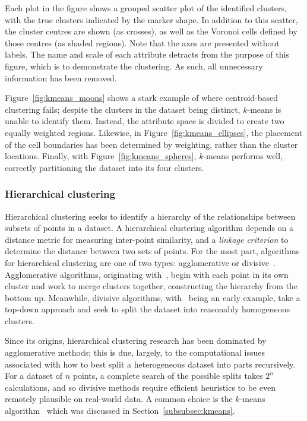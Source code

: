 Each plot in the figure shows a grouped scatter plot of the identified clusters,
with the true clusters indicated by the marker shape. In addition to this
scatter, the cluster centres are shown (as crosses), as well as the Voronoi
cells defined by those centres (as shaded regions). Note that the axes are
presented without labels. The name and scale of each attribute detracts from the
purpose of this figure, which is to demonstrate the clustering. As such, all
unnecessary information has been removed.

Figure~\ref{fig:kmeans_moons} shows a stark example of where centroid-based
clustering fails; despite the clusters in the dataset being distinct,
\(k\)-means is unable to identify them. Instead, the attribute space is divided
to create two equally weighted regions. Likewise, in
Figure~\ref{fig:kmeans_ellipses}, the placement of the cell boundaries has been
determined by weighting, rather than the cluster locations. Finally, with
Figure~\ref{fig:kmeans_spheres}, \(k\)-means performs well, correctly
partitioning the dataset into its four clusters.

\subsubsection{Hierarchical clustering}

Hierarchical clustering seeks to identify a hierarchy of the relationships
between subsets of points in a dataset. A hierarchical clustering algorithm
depends on a distance metric for measuring inter-point similarity, and a
\emph{linkage criterion} to determine the distance between two sets of points.
For the most part, algorithms for hierarchical clustering are one of two types:
agglomerative or divisive~\cite{Kaufman1990}. Agglomerative algorithms,
originating with~\cite{Johnson1967,Ward1963}, begin with each point in its own
cluster and work to merge clusters together, constructing the hierarchy from the
bottom up. Meanwhile, divisive algorithms, with~\cite{Edwards1965} being an
early example, take a top-down approach and seek to split the dataset into
reasonably homogeneous clusters.

Since its origins, hierarchical clustering research has been dominated by
agglomerative methods; this is due, largely, to the computational issues
associated with how to best split a heterogeneous dataset into parts
recursively. For a dataset of \(n\) points, a complete search of the possible
splits takes \(2^n\) calculations, and so divisive methods require efficient
heuristics to be even remotely plausible on real-world data. A common choice is
the \(k\)-means algorithm~\cite{Moseley2017,Peterson2018} which was discussed in
Section~\ref{subsubsec:kmeans}.

